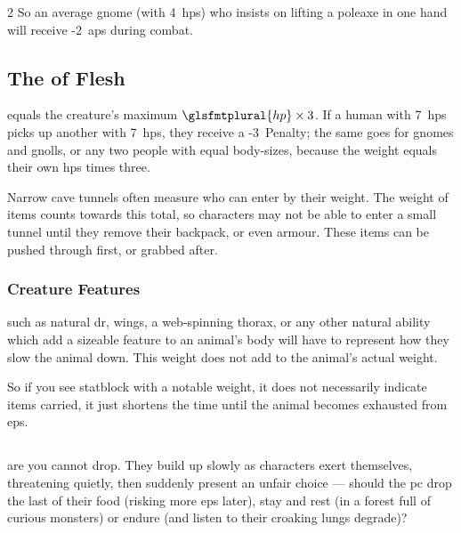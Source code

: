 \begin{multicols}{2}
So an average gnome (with 4~\glspl{hp}) who insists on lifting a poleaxe in one hand will receive -2~\glspl{ap} during combat.


\smallbreak

\subsection{The  of Flesh}

equals the creature's maximum $\glsfmtplural{hp} \times 3$.
If a human with 7~\glspl{hp} picks up another with 7~\glspl{hp}, they receive a -3~Penalty; the same goes for gnomes and gnolls, or any two people with equal body-sizes, because the \gls{weight} equals their own \glspl{hp} times three.

Narrow cave tunnels often measure who can enter by their \gls{weight}.
The \gls{weight} of items counts towards this total, so characters may not be able to enter a small tunnel until they remove their backpack, or even \gls{armour}.
These items can be pushed through first, or grabbed after.

\bigbreak

\subsubsection{Creature Features}
\label{featureWeight}%
%
such as natural \gls{dr}, wings, a web-spinning thorax, or any other natural ability which add a sizeable feature to an animal's body will have  to represent how they slow the animal down.
This \gls{weight} does not add to the animal's actual \gls{weight}.

So if you see  \gls{statblock} with a notable \gls{weight}, it does not necessarily indicate items carried, it just shortens the time until the animal becomes exhausted from \glspl{ep}.

\subsection{}
\label{ep}

 are  you cannot drop.  They build up slowly as
characters exert themselves, threatening quietly, then suddenly present an
unfair choice --- should the \gls{pc} drop the last of their food (risking more
\glspl{ep} later), stay and rest (in a forest full of curious \glspl{monster})
or endure (and listen to their croaking lungs degrade)?


\end{multicols}
